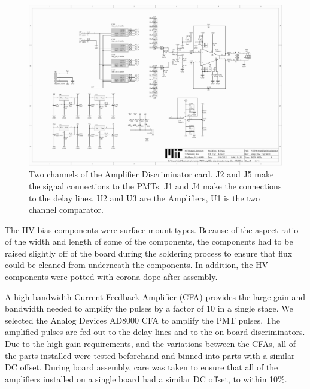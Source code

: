 \documentclass{JINST}
\begin{document}
\begin{figure}[ht]
\begin{center}
\includegraphics[width=5.5in, keepaspectratio=true, page=2, trim=4.54in 2.12in 4.54in 2.12in, clip=true]{graphics/veto_sch.pdf}
\caption{Two channels of the Amplifier Discriminator card.  J2 and J5 make the signal connections to the PMTs.  J1 and J4 make the connections to the delay lines.  U2 and U3 are the Amplifiers, U1 is the two channel comparator.
\label{fig:ampdiscsch}}
\end{center}
\end{figure}

The HV bias components were surface mount types.  Because of the
aspect ratio of the width and length of some of the components, the
components had to be raised slightly off of the board during the
soldering process to ensure that flux could be cleaned from underneath
the components.  In addition, the HV components were potted with
corona dope after assembly.

A high bandwidth Current Feedback Amplifier (CFA) provides the large
gain and bandwidth needed to amplify the pulses by a factor of 10 in a
single stage.  We selected the Analog Devices AD8000 CFA to amplify
the PMT pulses.  The amplified pulses are fed out to the delay
lines and to the on-board discriminators.  Due to the high-gain
requirements, and the variations between the CFAs, all of the parts
installed were tested beforehand and binned into parts with a similar
DC offset.  During board assembly, care was taken to ensure that all
of the amplifiers installed on a single board had a similar DC offset,
to within 10\%.
\end{document}
